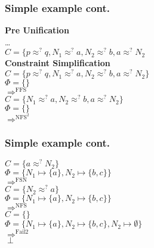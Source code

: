 	\begin{frame}[fragile=singleslide]
	\frametitle{Simple example cont.}
	\textbf{Pre Unification}\\
	\ldots \\
	\(C=\{p \approx^? q, N_1 \approx^? a, N_2 \approx^? b, a \approx^? N_2\)\\
	
	\vspace{0.5cm}
	\textbf{Constraint Simplification}\\
	\(C=\{p \approx^? q, N_1 \approx^? a, N_2 \approx^? b, a \approx^? N_2\}\)\\
	\(\Phi=\{\}\)\\
	\(\Rightarrow^{\text{FFS}}\)\\
	\(C=\{N_1 \approx^? a, N_2 \approx^? b, a \approx^? N_2\}\)\\
	\(\Phi=\{\}\)\\
	\(\Rightarrow^{\text{NFS}^2}\)\\
  \end{frame}	
	
	\begin{frame}[fragile=singleslide]
	\frametitle{Simple example cont.}
	\(C=\{ a \approx^? N_2\}\)\\
	\(\Phi=\{N_1\mapsto \{a\}, N_2\mapsto \{b,c\}\}\)\\
	\(\Rightarrow^{\text{FSN}}\)\\
	\(C=\{ N_2 \approx^? a\}\)\\
	\(\Phi=\{N_1\mapsto \{a\}, N_2\mapsto \{b,c\}\}\)\\
	\(\Rightarrow^{\text{NFS}}\)\\
	\(C=\{\}\)\\
	\(\Phi=\{N_1\mapsto \{a\}, N_2\mapsto \{b,c\},N_2\mapsto \emptyset\}\)\\
	\(\Rightarrow^{\text{Fail2}}\)\\
	\(\perp\)
  \end{frame}
